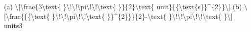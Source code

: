 \item (a) \textbackslash{[}\textbackslash frac\{3\textbackslash text\{
\}\textbackslash !\textbackslash !\textbackslash pi\textbackslash !\textbackslash !\textbackslash text\{
\}\}\{2\}\textbackslash text\{ unit\}\{\{\textbackslash text\{s\}\}\textasciicircum\{2\}\}\textbackslash{]}
(b) \textbackslash{[}\textbackslash frac\{\{\{\textbackslash text\{
\}\textbackslash !\textbackslash !\textbackslash pi\textbackslash !\textbackslash !\textbackslash text\{
\}\}\textasciicircum\{2\}\}\}\{2\}-\textbackslash text\{ \}\textbackslash !\textbackslash !\textbackslash pi\textbackslash !\textbackslash !\textbackslash text\{
\}\textbackslash{]} units3